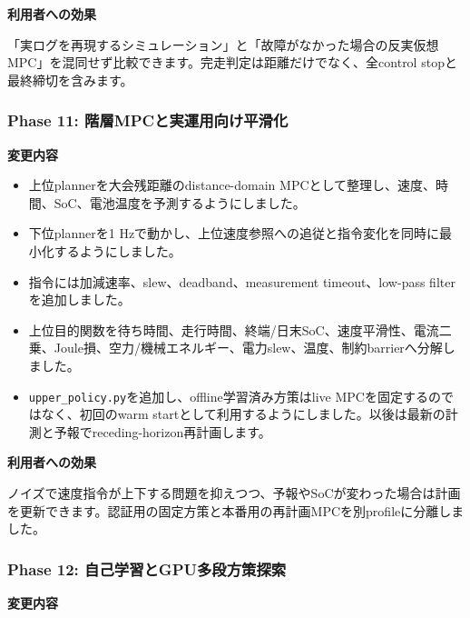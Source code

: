 \documentclass[
  japanese,
  a4paper,
  11pt]{article}
\providecommand{\tightlist}{%
  \setlength{\itemsep}{0pt}\setlength{\parskip}{0pt}}
\begin{document}
\textbf{利用者への効果}

「実ログを再現するシミュレーション」と「故障がなかった場合の反実仮想MPC」を混同せず比較できます。完走判定は距離だけでなく、全control
stopと最終締切を含みます。

\subsubsection{Phase 11:
階層MPCと実運用向け平滑化}\label{phase-11-ux968eux5c64mpcux3068ux5b9fux904bux7528ux5411ux3051ux5e73ux6ed1ux5316}

\textbf{変更内容}

\begin{itemize}
\tightlist
\item
  上位plannerを大会残距離のdistance-domain
  MPCとして整理し、速度、時間、SoC、電池温度を予測するようにしました。
\item
  下位plannerを1
  Hzで動かし、上位速度参照への追従と指令変化を同時に最小化するようにしました。
\item
  指令には加減速率、slew、deadband、measurement timeout、low-pass
  filterを追加しました。
\item
  上位目的関数を待ち時間、走行時間、終端/日末SoC、速度平滑性、電流二乗、Joule損、空力/機械エネルギー、電力slew、温度、制約barrierへ分解しました。
\item
  \texttt{upper\_policy.py}を追加し、offline学習済み方策はlive
  MPCを固定するのではなく、初回のwarm
  startとして利用するようにしました。以後は最新の計測と予報でreceding-horizon再計画します。
\end{itemize}

\textbf{利用者への効果}

ノイズで速度指令が上下する問題を抑えつつ、予報やSoCが変わった場合は計画を更新できます。認証用の固定方策と本番用の再計画MPCを別profileに分離しました。

\subsubsection{Phase 12:
自己学習とGPU多段方策探索}\label{phase-12-ux81eaux5df1ux5b66ux7fd2ux3068gpuux591aux6bb5ux65b9ux7b56ux63a2ux7d22}

\textbf{変更内容}
\end{document}
